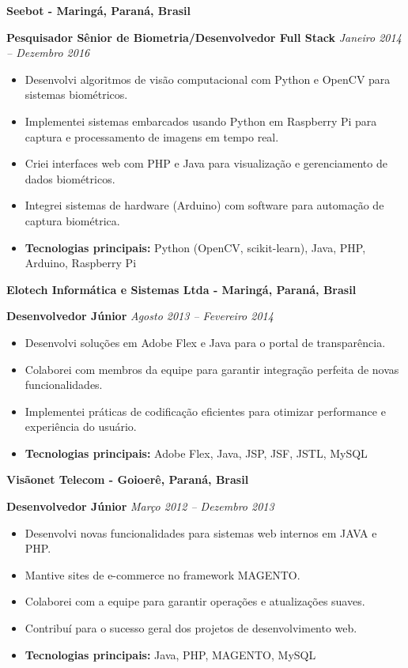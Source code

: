 \documentclass[12pt,a4paper,sans]{moderncv}
\begin{document}
\vspace{24pt}
\small{\textbf{Seebot - Maringá, Paraná, Brasil}}
\vspace{3pt}

\textbf{Pesquisador Sênior de Biometria/Desenvolvedor Full Stack} \hfill \textit{Janeiro 2014 -- Dezembro 2016}
\begin{itemize}
    \item Desenvolvi algoritmos de visão computacional com Python e OpenCV para sistemas biométricos.
    \item Implementei sistemas embarcados usando Python em Raspberry Pi para captura e processamento de imagens em tempo real.
    \item Criei interfaces web com PHP e Java para visualização e gerenciamento de dados biométricos.
    \item Integrei sistemas de hardware (Arduino) com software para automação de captura biométrica.
    \item \textbf{Tecnologias principais:} Python (OpenCV, scikit-learn), Java, PHP, Arduino, Raspberry Pi
\end{itemize}

\vspace{24pt}
\small{\textbf{Elotech Informática e Sistemas Ltda - Maringá, Paraná, Brasil}}
\vspace{3pt}

\textbf{Desenvolvedor Júnior} \hfill \textit{Agosto 2013 -- Fevereiro 2014}
\begin{itemize}
    \item Desenvolvi soluções em Adobe Flex e Java para o portal de transparência.
    \item Colaborei com membros da equipe para garantir integração perfeita de novas funcionalidades.
    \item Implementei práticas de codificação eficientes para otimizar performance e experiência do usuário.
    \item \textbf{Tecnologias principais:} Adobe Flex, Java, JSP, JSF, JSTL, MySQL
\end{itemize}

\vspace{24pt}
\small{\textbf{Visãonet Telecom - Goioerê, Paraná, Brasil}}
\vspace{3pt}

\textbf{Desenvolvedor Júnior} \hfill \textit{Março 2012 -- Dezembro 2013}
\begin{itemize}
    \item Desenvolvi novas funcionalidades para sistemas web internos em JAVA e PHP.
    \item Mantive sites de e-commerce no framework MAGENTO.
    \item Colaborei com a equipe para garantir operações e atualizações suaves.
    \item Contribuí para o sucesso geral dos projetos de desenvolvimento web.
    \item \textbf{Tecnologias principais:} Java, PHP, MAGENTO, MySQL
\end{itemize}
\end{document}
